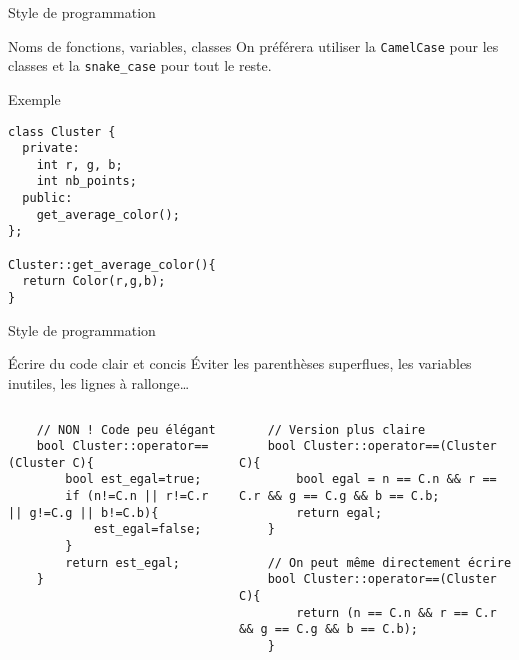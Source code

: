 \documentclass{beamer}
\begin{document}
\begin{frame}[fragile]{Style de programmation}

\begin{block}{Noms de fonctions, variables, classes}
On préférera utiliser la \texttt{CamelCase} pour les classes et la \texttt{snake_case} pour tout le reste.\\
\end{block}

\begin{exampleblock}{Exemple}
\begin{verbatim}
class Cluster {
  private:
    int r, g, b;
    int nb_points;
  public:
    get_average_color();
};

Cluster::get_average_color(){
  return Color(r,g,b);
}
\end{verbatim}
\end{exampleblock}
\end{frame}

\begin{frame}[fragile]{Style de programmation}
\begin{block}{Écrire du code clair et concis}
Éviter les parenthèses superflues, les variables inutiles, les lignes à rallonge\dots
\end{block}

\begin{columns}
    \begin{column}{0.57\textwidth}
    \begin{verbatim}
    // NON ! Code peu élégant
    bool Cluster::operator==(Cluster C){
        bool est_egal=true;
        if (n!=C.n || r!=C.r || g!=C.g || b!=C.b){
            est_egal=false;
        }
        return est_egal;
    }
    \end{verbatim}
    \end{column}
    \begin{column}{0.57\textwidth}
    \begin{verbatim}
    // Version plus claire
    bool Cluster::operator==(Cluster C){
        bool egal = n == C.n && r == C.r && g == C.g && b == C.b;
        return egal;
    }

    // On peut même directement écrire 
    bool Cluster::operator==(Cluster C){
        return (n == C.n && r == C.r && g == C.g && b == C.b);
    }
    \end{verbatim}
    \end{column}
\end{columns}
\end{frame}
\end{document}
